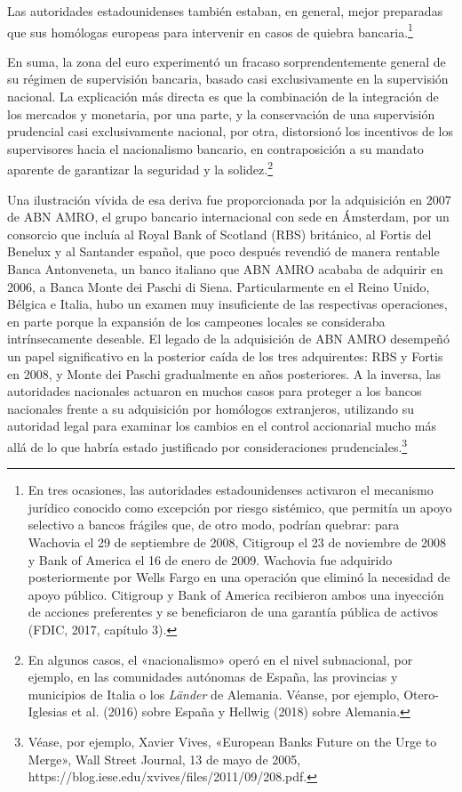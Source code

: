 \documentclass[10pt,a4paper]{article}
\begin{document}
{Las autoridades estadounidenses también estaban, en general, mejor preparadas que sus homólogas europeas para intervenir en casos de quiebra bancaria.\footnote{%
    En tres ocasiones, las autoridades estadounidenses activaron el mecanismo jurídico conocido como excepción por riesgo sistémico, que permitía un apoyo selectivo a bancos frágiles que, de otro modo, podrían quebrar: para Wachovia el 29 de septiembre de 2008, Citigroup el 23 de noviembre de 2008 y Bank of America el 16 de enero de 2009. Wachovia fue adquirido posteriormente por Wells Fargo en una operación que eliminó la necesidad de apoyo público. Citigroup y Bank of America recibieron ambos una inyección de acciones preferentes y se beneficiaron de una garantía pública de activos (FDIC, 2017, capítulo 3).
}

En suma, la zona del euro experimentó un fracaso sorprendentemente general de su régimen de supervisión bancaria, basado casi exclusivamente en la supervisión nacional. La explicación más directa es que la combinación de la integración de los mercados y monetaria, por una parte, y la conservación de una supervisión prudencial casi exclusivamente nacional, por otra, distorsionó los incentivos de los supervisores hacia el nacionalismo bancario, en contraposición a su mandato aparente de garantizar la seguridad y la solidez.\footnote{%
    En algunos casos, el «nacionalismo» operó en el nivel subnacional, por ejemplo, en las comunidades autónomas de España, las provincias y municipios de Italia o los \textit{Länder} de Alemania. Véanse, por ejemplo, Otero-Iglesias et al. (2016) sobre España y Hellwig (2018) sobre Alemania.
}

Una ilustración vívida de esa deriva fue proporcionada por la adquisición en 2007 de ABN AMRO, el grupo bancario internacional con sede en Ámsterdam, por un consorcio que incluía al Royal Bank of Scotland (RBS) británico, al Fortis del Benelux y al Santander español, que poco después revendió de manera rentable Banca Antonveneta, un banco italiano que ABN AMRO acababa de adquirir en 2006, a Banca Monte dei Paschi di Siena. Particularmente en el Reino Unido, Bélgica e Italia, hubo un examen muy insuficiente de las respectivas operaciones, en parte porque la expansión de los campeones locales se consideraba intrínsecamente deseable. El legado de la adquisición de ABN AMRO desempeñó un papel significativo en la posterior caída de los tres adquirentes: RBS y Fortis en 2008, y Monte dei Paschi gradualmente en años posteriores. A la inversa, las autoridades nacionales actuaron en muchos casos para proteger a los bancos nacionales frente a su adquisición por homólogos extranjeros, utilizando su autoridad legal para examinar los cambios en el control accionarial mucho más allá de lo que habría estado justificado por consideraciones prudenciales.\footnote{%
    Véase, por ejemplo, Xavier Vives, «European Banks Future on the Urge to Merge», Wall Street Journal, 13 de mayo de 2005, https://blog.iese.edu/xvives/files/2011/09/208.pdf.
}

}
\end{document}
